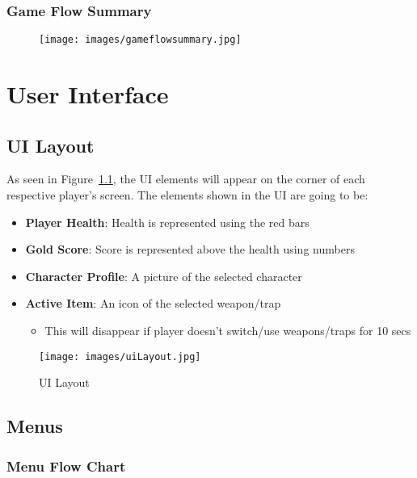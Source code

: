 \documentclass[10pt]{report}
\begin{document}
\subsection{Game Flow Summary}

\begin{figure}[H]
    \centering
    \texttt{[image: images/gameflowsummary.jpg]}
    \caption{}
\end{figure}


\chapter{User Interface}

\section{UI Layout}

As seen in Figure~\ref{fig:uilayout}, the UI elements will appear on the corner of each respective player's screen. The elements shown in the UI are going to be:

\begin{itemize}
    \item \textbf{Player Health}: Health is represented using the red bars
    \item \textbf{Gold Score}: Score is represented above the health using numbers
    \item \textbf{Character Profile}: A picture of the selected character
    \item \textbf{Active Item}: An icon of the selected weapon/trap 
    \begin{itemize}
        \item This will disappear if player doesn’t switch/use weapons/traps for 10 secs
    \end{itemize}
\end{itemize}

\begin{figure}[H]
	\texttt{[image: images/uiLayout.jpg]}
    \caption{UI Layout}
    \label{fig:uilayout}
\end{figure}

\section{Menus}

\subsection{Menu Flow Chart}
\end{document}
